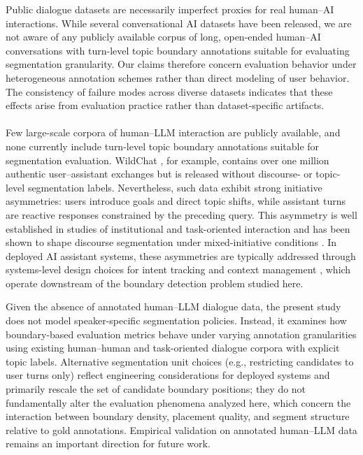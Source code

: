 \documentclass{article}
\makeatletter
\newcommand{\myparagraph}[1]{%
  \paragraph{\@addpunct{#1}}%
}
\makeatother
\begin{document}
Public dialogue datasets are necessarily imperfect proxies for real
human--AI interactions. While several conversational AI datasets have
been released, we are not aware of any publicly available corpus of
long, open-ended human--AI conversations with turn-level topic
boundary annotations suitable for evaluating segmentation granularity.
Our claims therefore concern evaluation behavior under heterogeneous
annotation schemes rather than direct modeling of user behavior. The
consistency of failure modes across diverse datasets indicates that
these effects arise from evaluation practice rather than
dataset-specific artifacts.

\myparagraph{Human--LLM chat data and annotation availability}
\label{sec:chatdata}
Few large-scale corpora of human--LLM interaction are publicly
available, and none currently include turn-level topic boundary
annotations suitable for segmentation evaluation. WildChat
\cite{zhao2024wildchat}, for example, contains over one million
authentic user--assistant exchanges but is released without discourse-
or topic-level segmentation labels. Nevertheless, such data exhibit
strong initiative asymmetries: users introduce goals and direct topic
shifts, while assistant turns are reactive responses constrained by the
preceding query. This asymmetry is well established in studies of
institutional and task-oriented interaction \cite{drew1992talk} and
has been shown to shape discourse segmentation under mixed-initiative
conditions \cite{walker1990mixed}. In deployed AI assistant
systems, these asymmetries are typically addressed through
systems-level design choices for intent tracking and context
management \cite{chopra2024exploring}, which operate downstream of the
boundary detection problem studied here.

Given the absence of annotated human--LLM dialogue data, the present
study does not model speaker-specific segmentation policies. Instead,
it examines how boundary-based evaluation metrics behave under varying
annotation granularities using existing human--human and task-oriented
dialogue corpora with explicit topic labels. Alternative segmentation
unit choices (e.g., restricting candidates to user turns only) reflect
engineering considerations for deployed systems and primarily rescale
the set of candidate boundary positions; they do not fundamentally
alter the evaluation phenomena analyzed here, which concern the
interaction between boundary density, placement quality, and segment
structure relative to gold annotations. Empirical validation on
annotated human--LLM data remains an important direction for future
work.
\end{document}
